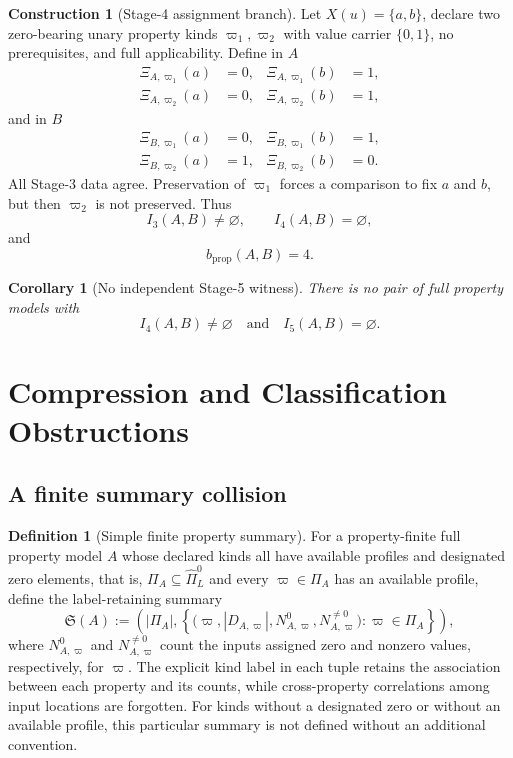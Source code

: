 \documentclass[11pt]{article}
\newcommand{\PiZero}{\widehat{\Pi}_{L}^{0}}
\newtheorem{corollary}[theorem]{Corollary}
\theoremstyle{definition}
\newtheorem{definition}[theorem]{Definition}
\newtheorem{construction}[theorem]{Construction}
\theoremstyle{remark}
\begin{document}
\begin{construction}[Stage-4 assignment branch]
Let \(X(u)=\{a,b\}\), declare two zero-bearing unary property kinds \(\varpi_1,\varpi_2\) with value carrier \(\{0,1\}\), no prerequisites, and full applicability.
Define in \(A\)
\[
\begin{aligned}
\Xi_{A,\varpi_1}(a)&=0,&\Xi_{A,\varpi_1}(b)&=1,\\
\Xi_{A,\varpi_2}(a)&=0,&\Xi_{A,\varpi_2}(b)&=1,
\end{aligned}
\]
and in \(B\)
\[
\begin{aligned}
\Xi_{B,\varpi_1}(a)&=0,&\Xi_{B,\varpi_1}(b)&=1,\\
\Xi_{B,\varpi_2}(a)&=1,&\Xi_{B,\varpi_2}(b)&=0.
\end{aligned}
\]
All Stage-3 data agree.
Preservation of \(\varpi_1\) forces a comparison to fix \(a\) and \(b\), but then \(\varpi_2\) is not preserved.
Thus
\[
I_3(A,B)\neq\varnothing,
\qquad
I_4(A,B)=\varnothing,
\]
and
\[
b_{\mathrm{prop}}(A,B)=4.
\]
\end{construction}

\begin{corollary}[No independent Stage-5 witness]
There is no pair of full property models with
\[
I_4(A,B)\neq\varnothing
\quad\text{and}\quad
I_5(A,B)=\varnothing.
\]
\end{corollary}

\section{Compression and Classification Obstructions}
\label{sec:compression}

\subsection{A finite summary collision}

\begin{definition}[Simple finite property summary]
For a property-finite full property model \(A\) whose declared kinds all have available profiles and designated zero elements, that is,
\(\Pi_A\subseteq\PiZero\) and every \(\varpi\in\Pi_A\) has an available profile, define the label-retaining summary
\[
\mathfrak S(A):=
\left(
|\Pi_A|,
\left\{
\bigl(\varpi,|D_{A,\varpi}|,N^0_{A,\varpi},N^{\neq0}_{A,\varpi}\bigr)
:\varpi\in\Pi_A
\right\}
\right),
\]
where \(N^0_{A,\varpi}\) and \(N^{\neq0}_{A,\varpi}\) count the inputs assigned zero and nonzero values, respectively, for \(\varpi\).
The explicit kind label in each tuple retains the association between each property and its counts, while cross-property correlations among input locations are forgotten.
For kinds without a designated zero or without an available profile, this particular summary is not defined without an additional convention.
\end{definition}
\end{document}
